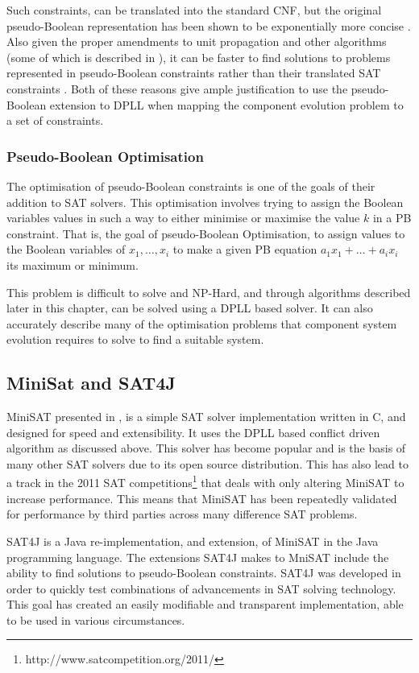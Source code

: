 Such constraints, can be translated into the standard CNF, but the original pseudo-Boolean representation has been shown to be exponentially more concise \citep{dixon2004automating}.
Also given the proper amendments to unit propagation and other algorithms (some of which is described in \cite{Sheini2006}), 
it can be faster to find solutions to problems represented in pseudo-Boolean constraints rather than their translated SAT constraints \citep{dixon2004automating}.
Both of these reasons give ample justification to use the pseudo-Boolean extension to DPLL when mapping the component evolution problem to a set of constraints. 

\subsubsection{Pseudo-Boolean Optimisation}
The optimisation of pseudo-Boolean constraints is one of the goals of their addition to SAT solvers.
This optimisation involves trying to assign the Boolean variables values in such a way to either minimise or maximise the value $k$ in a PB constraint.
That is, the goal of pseudo-Boolean Optimisation, to assign values to the Boolean variables of $x_1,\ldots,x_i$ to make a given PB equation $a_1x_1 + \ldots + a_ix_i$ its maximum or minimum.

This problem is difficult to solve and NP-Hard, and through algorithms described later in this chapter, can be solved using a DPLL based solver.
It can also accurately describe many of the optimisation problems that component system evolution requires to solve to find a suitable system.

\subsection{MiniSat and SAT4J}
MiniSAT presented in \cite{een2003}, is a simple SAT solver implementation written in C, and designed for speed and extensibility.
It uses the DPLL based conflict driven algorithm as discussed above.
This solver has become popular and is the basis of many other SAT solvers due to its open source distribution.
This has also lead to a track in the 2011 SAT competitions\footnote{http://www.satcompetition.org/2011/} that deals with only altering MiniSAT to increase performance.
This means that MiniSAT has been repeatedly validated for performance by third parties across many difference SAT problems. 

SAT4J \citep{le2010sat4j} is a Java re-implementation, and extension, of MiniSAT in the Java programming language.
The extensions SAT4J makes to MniSAT include the ability to find solutions to pseudo-Boolean constraints.
SAT4J was developed in order to quickly test combinations of advancements in SAT solving technology.
This goal has created an easily modifiable and transparent implementation, able to be used in various circumstances.

